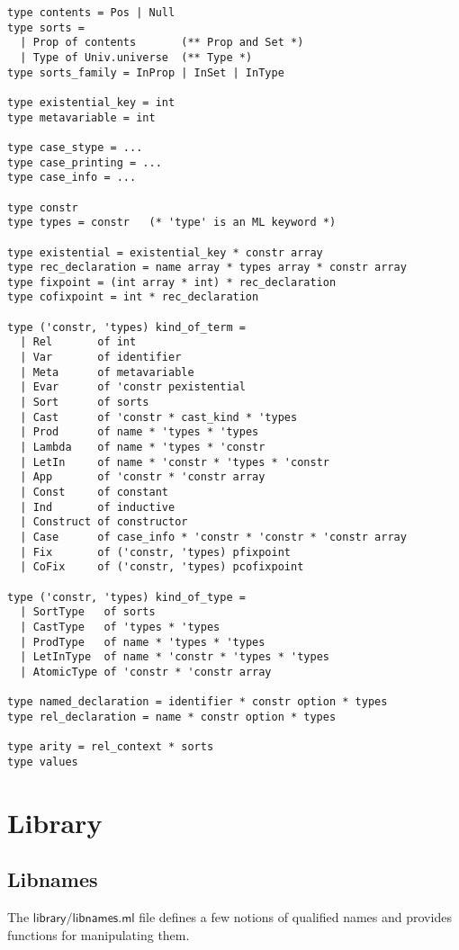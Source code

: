 \documentclass[a4paper,oneside]{book}
\newcommand{\m}[1]{\ensuremath{\mathsf{#1}}}
\begin{document}
\begin{lstlisting}
type contents = Pos | Null
type sorts =
  | Prop of contents       (** Prop and Set *)
  | Type of Univ.universe  (** Type *)
type sorts_family = InProp | InSet | InType

type existential_key = int
type metavariable = int

type case_stype = ...
type case_printing = ...
type case_info = ...

type constr
type types = constr   (* 'type' is an ML keyword *)

type existential = existential_key * constr array
type rec_declaration = name array * types array * constr array
type fixpoint = (int array * int) * rec_declaration
type cofixpoint = int * rec_declaration

type ('constr, 'types) kind_of_term =
  | Rel       of int
  | Var       of identifier
  | Meta      of metavariable
  | Evar      of 'constr pexistential
  | Sort      of sorts
  | Cast      of 'constr * cast_kind * 'types
  | Prod      of name * 'types * 'types
  | Lambda    of name * 'types * 'constr
  | LetIn     of name * 'constr * 'types * 'constr
  | App       of 'constr * 'constr array
  | Const     of constant
  | Ind       of inductive
  | Construct of constructor
  | Case      of case_info * 'constr * 'constr * 'constr array
  | Fix       of ('constr, 'types) pfixpoint
  | CoFix     of ('constr, 'types) pcofixpoint

type ('constr, 'types) kind_of_type =
  | SortType   of sorts
  | CastType   of 'types * 'types
  | ProdType   of name * 'types * 'types
  | LetInType  of name * 'constr * 'types * 'types
  | AtomicType of 'constr * 'constr array

type named_declaration = identifier * constr option * types
type rel_declaration = name * constr option * types

type arity = rel_context * sorts
type values
\end{lstlisting}

\newpage

\section{Library}

\subsection{Libnames}

The \m{library/libnames.ml} file defines a few notions of qualified
names and provides functions for manipulating them.
\end{document}
